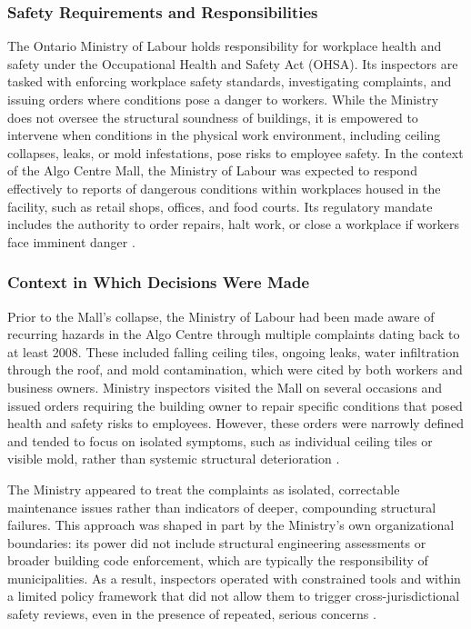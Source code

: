\documentclass[12pt]{article}
\begin{document}
\subsubsection*{Safety Requirements and Responsibilities}
The Ontario Ministry of Labour holds responsibility for workplace health and safety under the Occupational Health and Safety Act (OHSA). Its inspectors are tasked with enforcing workplace safety standards, investigating complaints, and issuing orders where conditions pose a danger to workers. While the Ministry does not oversee the structural soundness of buildings, it is empowered to intervene when conditions in the physical work environment, including ceiling collapses, leaks, or mold infestations, pose risks to employee safety. In the context of the Algo Centre Mall, the Ministry of Labour was expected to respond effectively to reports of dangerous conditions within workplaces housed in the facility, such as retail shops, offices, and food courts. Its regulatory mandate includes the authority to order repairs, halt work, or close a workplace if workers face imminent danger \cite[p3-4, p140-145]{AlgoLakeReport1}.

\subsubsection*{Context in Which Decisions Were Made}

Prior to the Mall's collapse, the Ministry of Labour had been made aware of recurring hazards in the Algo Centre through multiple complaints dating back to at least 2008. These included falling ceiling tiles, ongoing leaks, water infiltration through the roof, and mold contamination, which were cited by both workers and business owners. Ministry inspectors visited the Mall on several occasions and issued orders requiring the building owner to repair specific conditions that posed health and safety risks to employees. However, these orders were narrowly defined and tended to focus on isolated symptoms, such as individual ceiling tiles or visible mold, rather than systemic structural deterioration \cite[p145-149]{AlgoLakeReport1}.

The Ministry appeared to treat the complaints as isolated, correctable maintenance issues rather than indicators of deeper, compounding structural failures. This approach was shaped in part by the Ministry's own organizational boundaries: its power did not include structural engineering assessments or broader building code enforcement, which are typically the responsibility of municipalities. As a result, inspectors operated with constrained tools and within a limited policy framework that did not allow them to trigger cross-jurisdictional safety reviews, even in the presence of repeated, serious concerns \cite[p148-149]{AlgoLakeReport1}.
\end{document}
